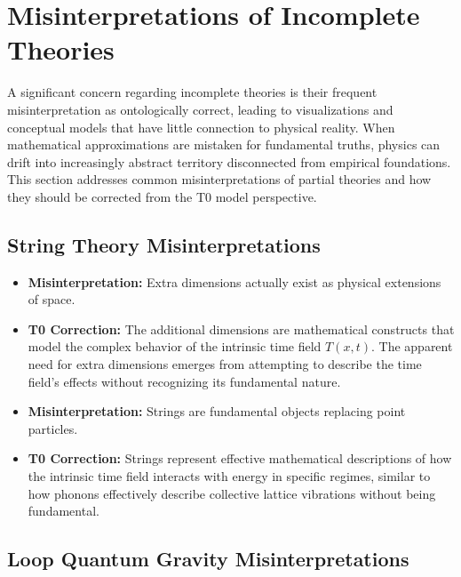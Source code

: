 \documentclass[12pt,a4paper]{article}
\newcommand{\Tfieldt}{T(x,t)}
\begin{document}
	\section{Misinterpretations of Incomplete Theories}
	\label{sec:misinterpretations}
	
	A significant concern regarding incomplete theories is their frequent misinterpretation as ontologically correct, leading to visualizations and conceptual models that have little connection to physical reality. When mathematical approximations are mistaken for fundamental truths, physics can drift into increasingly abstract territory disconnected from empirical foundations. This section addresses common misinterpretations of partial theories and how they should be corrected from the T0 model perspective.
	
	\subsection{String Theory Misinterpretations}
	\label{subsec:string_misinterpretations}
	
	\begin{itemize}
		\item \textbf{Misinterpretation:} Extra dimensions actually exist as physical extensions of space.
		\item \textbf{T0 Correction:} The additional dimensions are mathematical constructs that model the complex behavior of the intrinsic time field $\Tfieldt$. The apparent need for extra dimensions emerges from attempting to describe the time field's effects without recognizing its fundamental nature.
		
		\item \textbf{Misinterpretation:} Strings are fundamental objects replacing point particles.
		\item \textbf{T0 Correction:} Strings represent effective mathematical descriptions of how the intrinsic time field interacts with energy in specific regimes, similar to how phonons effectively describe collective lattice vibrations without being fundamental.
	\end{itemize}
	
	\subsection{Loop Quantum Gravity Misinterpretations}
	\label{subsec:lqg_misinterpretations}
	
\end{document}
